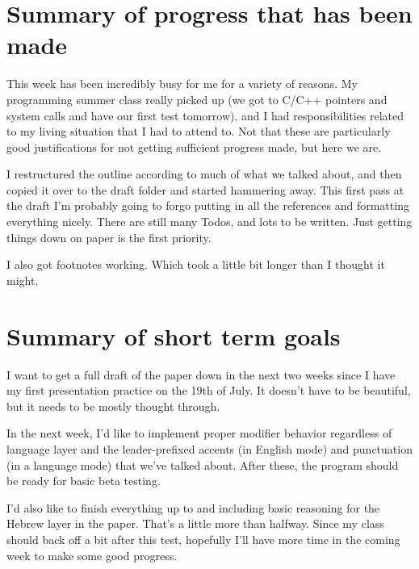 \documentclass[11pt]{article}
\date{\today}
\title{}
\begin{document}
\tableofcontents


\section{Summary of progress that has been made}
\label{sec:org9321430}

This week has been incredibly busy for me for a variety of reasons. My programming summer class really picked up (we got to C/C++ pointers and system calls and have our first test tomorrow), and I had responsibilities related to my living situation that I had to attend to. Not that these are particularly good justifications for not getting sufficient progress made, but here we are.

I restructured the outline according to much of what we talked about, and then copied it over to the draft folder and started hammering away. This first pass at the draft I'm probably going to forgo putting in all the references and formatting everything nicely. There are still many Todos, and lots to be written. Just getting things down on paper is the first priority.

I also got footnotes working. Which took a little bit longer than I thought it might.

\section{Summary of short term goals}
\label{sec:org8c797bf}

I want to get a full draft of the paper down in the next two weeks since I have my first presentation practice on the 19th of July. It doesn't have to be beautiful, but it needs to be mostly thought through.

In the next week, I'd like to implement proper modifier behavior regardless of language layer and the leader-prefixed accents (in English mode) and punctuation (in a language mode) that we've talked about. After these, the program should be ready for basic beta testing.

I'd also like to finish everything up to and including basic reasoning for the Hebrew layer in the paper. That's a little more than halfway. Since my class should back off a bit after this test, hopefully I'll have more time in the coming week to make some good progress.
\end{document}
